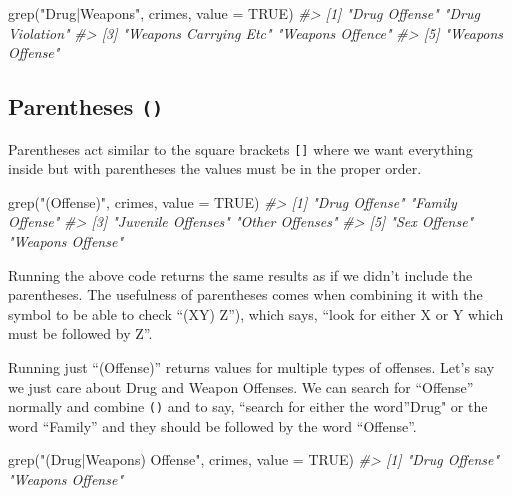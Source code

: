 \documentclass[
  12pt,
  openany]{book}
\newenvironment{Shaded}{\begin{snugshade}}{\end{snugshade}}
\newcommand{\AttributeTok}[1]{\textcolor[rgb]{0.61,0.61,0.61}{#1}}
\newcommand{\CommentTok}[1]{\textcolor[rgb]{0.37,0.37,0.37}{\textit{#1}}}
\newcommand{\ConstantTok}[1]{\textcolor[rgb]{0,0,0}{#1}}
\newcommand{\FunctionTok}[1]{\textcolor[rgb]{0,0,0}{#1}}
\newcommand{\NormalTok}[1]{#1}
\newcommand{\StringTok}[1]{\textcolor[rgb]{0.5,0.5,0.5}{#1}}
\begin{document}
\begin{Shaded}
\begin{Highlighting}[]
\FunctionTok{grep}\NormalTok{(}\StringTok{"Drug|Weapons"}\NormalTok{, crimes, }\AttributeTok{value =} \ConstantTok{TRUE}\NormalTok{)}
\CommentTok{\#\textgreater{} [1] "Drug Offense"         "Drug Violation"      }
\CommentTok{\#\textgreater{} [3] "Weapons Carrying Etc" "Weapons Offence"     }
\CommentTok{\#\textgreater{} [5] "Weapons Offense"}
\end{Highlighting}
\end{Shaded}

\hypertarget{parentheses}{%
\subsection{\texorpdfstring{Parentheses \texttt{()}}{Parentheses ()}}\label{parentheses}}

Parentheses act similar to the square brackets \texttt{{[}{]}} where we want everything inside but with parentheses the values must be in the proper order.

\begin{Shaded}
\begin{Highlighting}[]
\FunctionTok{grep}\NormalTok{(}\StringTok{"(Offense)"}\NormalTok{, crimes, }\AttributeTok{value =} \ConstantTok{TRUE}\NormalTok{)}
\CommentTok{\#\textgreater{} [1] "Drug Offense"      "Family Offense"   }
\CommentTok{\#\textgreater{} [3] "Juvenile Offenses" "Other Offenses"   }
\CommentTok{\#\textgreater{} [5] "Sex Offense"       "Weapons Offense"}
\end{Highlighting}
\end{Shaded}

Running the above code returns the same results as if we didn't include the parentheses. The usefulness of parentheses comes when combining it with the \texttt{\textbar{}} symbol to be able to check ``(X\textbar Y) Z''), which says, ``look for either X or Y which must be followed by Z''.

Running just ``(Offense)'' returns values for multiple types of offenses. Let's say we just care about Drug and Weapon Offenses. We can search for ``Offense'' normally and combine \texttt{()} and \texttt{\textbar{}} to say, ``search for either the word''Drug" or the word ``Family'' and they should be followed by the word ``Offense''.

\begin{Shaded}
\begin{Highlighting}[]
\FunctionTok{grep}\NormalTok{(}\StringTok{"(Drug|Weapons) Offense"}\NormalTok{, crimes, }\AttributeTok{value =} \ConstantTok{TRUE}\NormalTok{)}
\CommentTok{\#\textgreater{} [1] "Drug Offense"    "Weapons Offense"}
\end{Highlighting}
\end{Shaded}
\end{document}

